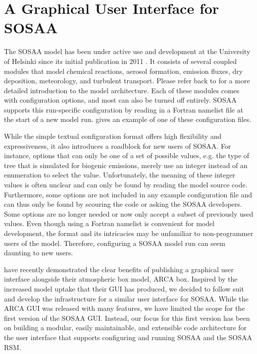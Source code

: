 \chapter{A Graphical User Interface for SOSAA} \label{txt:sosaa-gui-chapter}

The SOSAA model has been under active use and development at the University of Helsinki since its initial publication in 2011 \cite{sosa-description-2011}. It consists of several coupled modules that model chemical reactions, aerosol formation, emission fluxes, dry deposition, meteorology, and turbulent transport. Please refer back to  for a more detailed introduction to the model architecture. Each of these modules comes with configuration options, and most can also be turned off entirely. SOSAA supports this run-specific configuration by reading in a Fortran namelist file at the start of a new model run.  gives an example of one of these configuration files.

\newpar While the simple textual configuration format offers high flexibility and expressiveness, it also introduces a roadblock for new users of SOSAA. For instance, options that can only be one of a set of possible values, e.g. the type of tree that is simulated for biogenic emissions, merely use an integer instead of an enumeration to select the value. Unfortunately, the meaning of these integer values is often unclear and can only be found by reading the model source code. Furthermore, some options are not included in any example configuration file and can thus only be found by scouring the code or asking the SOSAA developers. Some options are no longer needed or now only accept a subset of previously used values. Even though using a Fortran namelist is convenient for model development, the format and its intricacies may be unfamiliar to non-programmer users of the model. Therefore, configuring a SOSAA model run can seem daunting to new users.

\textcite{arca-box-2022} have recently demonstrated the clear benefits of publishing a graphical user interface alongside their atmospheric box model, ARCA box. Inspired by the increased model uptake that their GUI has produced, we decided to follow suit and develop the infrastructure for a similar user interface for SOSAA. While the ARCA GUI was released with many features, we have limited the scope for the first version of the SOSAA GUI. Instead, our focus for this first version has been on building a modular, easily maintainable, and extensible code architecture for the user interface that supports configuring and running SOSAA and the SOSAA RSM.

